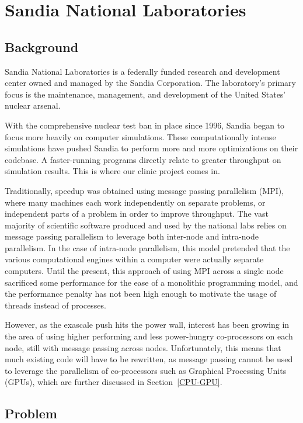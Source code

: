 
\chapter{Sandia National Laboratories}

\section{Background}

Sandia National Laboratories is a federally funded research and development
center owned and managed by the Sandia Corporation.  The laboratory's primary
focus is the maintenance, management, and development of the United States'
nuclear arsenal. 

With the comprehensive nuclear test ban in place since 1996, Sandia began to focus more heavily on
computer simulations. These computationally intense simulations have pushed Sandia
to perform more and more optimizations on their codebase. A faster-running programs
directly relate to greater throughput on simulation results. This is where our clinic project comes in.

Traditionally, speedup was obtained using message passing parallelism (MPI), where many machines
each work independently on separate problems, or independent parts of a problem in order to 
improve throughput. The vast
majority of scientific software produced and used by the national labs relies on
message passing parallelism to leverage both inter-node and intra-node
parallelism. In the case of intra-node parallelism, this model pretended that the 
various computational engines within a computer were actually separate computers.
Until the present, this approach of using MPI across a single node
sacrificed some performance for the ease of a monolithic programming model, and
the performance penalty has not been high enough to motivate the usage of
threads instead of processes. 

However, as the exascale push hits the power
wall, interest has been growing in the area of using higher performing and less
power-hungry co-processors on each node, still with message passing across
nodes.  Unfortunately, this means that much existing code will have to be rewritten, as
message passing cannot be used to leverage the parallelism of co-processors such
as Graphical Processing Units (GPUs), which are further discussed in Section~\ref{CPU-GPU}.


\section{Problem}

